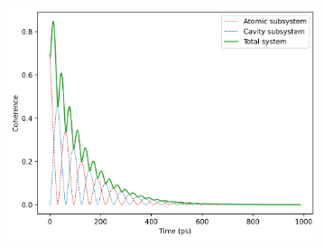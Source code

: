 \documentclass[12pt]{article}
\begin{document}
\begin{figure}[H]
    \begin{subfigure}{0.45\textwidth}
        \centering
        \includegraphics[width=0.85\linewidth]{Research Project/Code/results/JCM/OQS_Coh_Both_eg.png}
        \caption{}
        \label{fig:JCM_OQS_Coh_Both_eg}
    \end{subfigure}
    \hfill
    \caption{}
    \label{fig:JCM_OQS_Coh_eg}
\end{figure}
\end{document}
